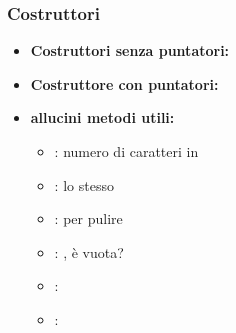 \subsubsection{Costruttori}
\begin{itemize}
    \item \textbf{Costruttori senza puntatori:}
    \begin{tcolorbox}[width=15cm, boxsep=10pt]
        
    \end{tcolorbox}
    \item  \textbf{Costruttore con puntatori:}
    \begin{tcolorbox}[width=15cm, boxsep=10pt]
        
    \end{tcolorbox}
    \item \textbf{allucini metodi utili:}
    \begin{tcolorbox} 
        
        \begin{itemize}
            \item \textbf{\textcolor{blue}{}}: numero di caratteri in 
            \item \textbf{\textcolor{blue}{}}: lo stesso
            \item \textbf{\textcolor{blue}{}}: per pulire 
            \item \textbf{\textcolor{blue}{}}: , è vuota?
            \item \textbf{\textcolor{blue}{}}: 
            \item \textbf{\textcolor{blue}{}}: 
        \end{itemize}
    \end{tcolorbox}
\end{itemize}
\newpage
